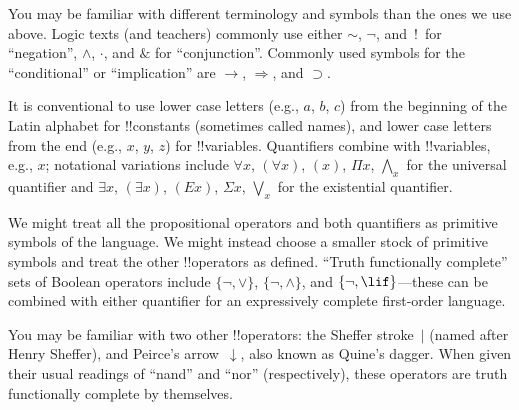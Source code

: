 \documentclass[../../include/open-logic-section]{subfiles}
\begin{document}

\begin{intro}
You may be familiar with different terminology and symbols than the
ones we use above. Logic texts (and teachers) commonly use either
$\sim$, $\neg$, and~!\ for ``negation'', $\wedge$, $\cdot$, and $\&$
for ``conjunction''.  Commonly used symbols for the ``conditional'' or
``implication'' are $\rightarrow$, $\Rightarrow$, and $\supset$.

It is conventional to use lower case letters (e.g., $a$, $b$, $c$) from
the beginning of the Latin alphabet for !!{constant}s (sometimes called
names), and lower case letters from the end (e.g., $x$, $y$, $z$) for
!!{variable}s. Quantifiers combine with !!{variable}s, e.g., $x$;
notational variations include $\forall x$, $(\forall x)$, $(x)$, $\Pi x$,
$\bigwedge_x$ for the universal quantifier and $\exists x$, $(\exists
x)$, $(Ex)$, $\Sigma x$, $\bigvee_x$ for the existential quantifier.
\end{intro}

\begin{explain}
We might treat all the propositional operators and both quantifiers as
primitive symbols of the language.  We might instead choose a smaller
stock of primitive symbols and treat the other !!{operator}s as
defined. ``Truth functionally complete'' sets of Boolean operators
include $\{ \lnot, \lor \}$, $\{ \lnot, \land \}$, and $\{ \lnot,
\lif\}$---these can be combined with either quantifier for an
expressively complete first-order language.

You may be familiar with two other !!{operator}s: the Sheffer
stroke~$|$ (named after Henry Sheffer), and Peirce's
arrow~$\downarrow$, also known as Quine's dagger.  When given their
usual readings of ``nand'' and ``nor'' (respectively), these operators
are truth functionally complete by themselves.
\end{explain}
\end{document}
